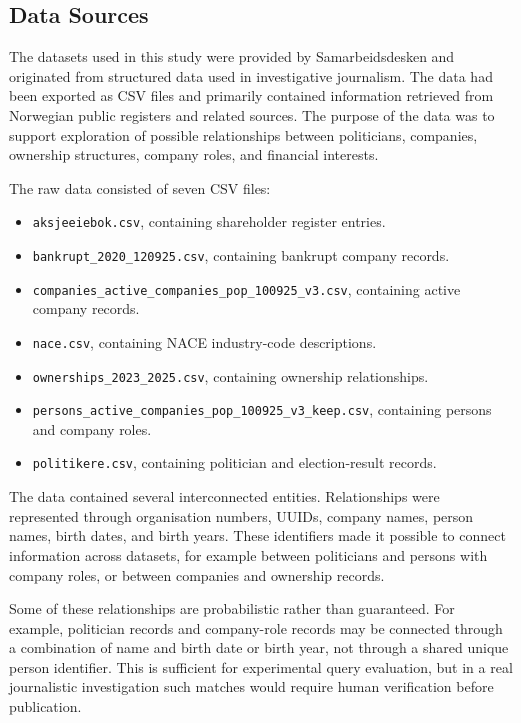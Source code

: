 \subsection{Data Sources}

The datasets used in this study were provided by Samarbeidsdesken and originated from structured data used in investigative journalism. The data had been exported as CSV files and primarily contained information retrieved from Norwegian public registers and related sources. The purpose of the data was to support exploration of possible relationships between politicians, companies, ownership structures, company roles, and financial interests.

The raw data consisted of seven CSV files:

\begin{itemize}
    \item \texttt{aksjeeiebok.csv}, containing shareholder register entries.
    \item \texttt{bankrupt\_2020\_120925.csv}, containing bankrupt company records.
    \item \texttt{companies\_active\_companies\_pop\_100925\_v3.csv}, containing active company records.
    \item \texttt{nace.csv}, containing NACE industry-code descriptions.
    \item \texttt{ownerships\_2023\_2025.csv}, containing ownership relationships.
    \item \texttt{persons\_active\_companies\_pop\_100925\_v3\_keep.csv}, containing persons and company roles.
    \item \texttt{politikere.csv}, containing politician and election-result records.
\end{itemize}

The data contained several interconnected entities. Relationships were represented through organisation numbers, UUIDs, company names, person names, birth dates, and birth years. These identifiers made it possible to connect information across datasets, for example between politicians and persons with company roles, or between companies and ownership records.

Some of these relationships are probabilistic rather than guaranteed. For example, politician records and company-role records may be connected through a combination of name and birth date or birth year, not through a shared unique person identifier. This is sufficient for experimental query evaluation, but in a real journalistic investigation such matches would require human verification before publication.


